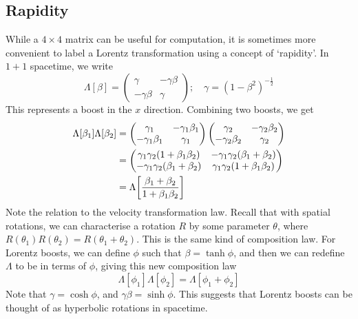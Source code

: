 \subsection{Rapidity}
While a \(4\times 4\) matrix can be useful for computation, it is sometimes more convenient to label a Lorentz transformation using a concept of `rapidity'.
In \(1+1\) spacetime, we write
\[
	\Lambda[\beta] = \begin{pmatrix}
		\gamma       & -\gamma\beta \\
		-\gamma\beta & \gamma
	\end{pmatrix};\quad \gamma = (1 - \beta^2)^{-\frac{1}{2}}
\]
This represents a boost in the \(x\) direction.
Combining two boosts, we get
\begin{align*}
	\Lambda[\beta_1]\Lambda[\beta_2] &= \begin{pmatrix}
		\gamma_1         & -\gamma_1\beta_1 \\
		-\gamma_1\beta_1 & \gamma_1
	\end{pmatrix}\begin{pmatrix}
		\gamma_2         & -\gamma_2\beta_2 \\
		-\gamma_2\beta_2 & \gamma_2
	\end{pmatrix} \\
	&= \begin{pmatrix}
		\gamma_1\gamma_2(1 + \beta_1 \beta_2) & -\gamma_1\gamma_2(\beta_1 + \beta_2)  \\
		-\gamma_1\gamma_2(\beta_1 + \beta_2)  & \gamma_1\gamma_2(1 + \beta_1 \beta_2)
	\end{pmatrix} \\
	&= \Lambda\qty[\frac{\beta_1 + \beta_2}{1 + \beta_1\beta_2}]
\end{align*}
Note the relation to the velocity transformation law.
Recall that with spatial rotations, we can characterise a rotation \(R\) by some parameter \(\theta\), where \(R(\theta_1) R(\theta_2) = R(\theta_1 + \theta_2)\).
This is the same kind of composition law.
For Lorentz boosts, we can define \(\phi\) such that \(\beta = \tanh\phi\), and then we can redefine \(\Lambda\) to be in terms of \(\phi\), giving this new composition law
\[
	\Lambda[\phi_1]\Lambda[\phi_2] = \Lambda[\phi_1 + \phi_2]
\]
Note that \(\gamma = \cosh \phi\), and \(\gamma\beta = \sinh \phi\).
This suggests that Lorentz boosts can be thought of as hyperbolic rotations in spacetime.
